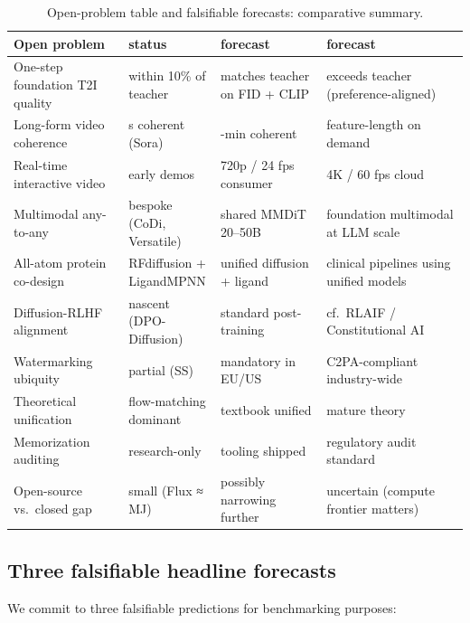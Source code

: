 \documentclass{article}
\begin{document}
\begin{table}[t]
\centering
\caption{Open-problem table and falsifiable forecasts: comparative summary.}
\label{tab:open-problem-table-and-falsifiable-forecasts}
\begin{tabular}{>{\raggedright\arraybackslash}p{0.2500\linewidth}
  >{\raggedright\arraybackslash}p{0.2016\linewidth}
  >{\raggedright\arraybackslash}p{0.2339\linewidth}
  >{\raggedright\arraybackslash}p{0.3145\linewidth}}
\toprule
Open problem & 2026 status & 2027 forecast & 2030 forecast \\
\midrule
One-step foundation T2I quality & within 10\% of teacher & matches teacher on FID + CLIP & exceeds teacher (preference-aligned) \\
Long-form video coherence & 60 s coherent (Sora) & 5-min coherent & feature-length on demand \\
Real-time interactive video & early demos & 720p / 24 fps consumer & 4K / 60 fps cloud \\
Multimodal any-to-any & bespoke (CoDi, Versatile) & shared MMDiT 20--50B & foundation multimodal at LLM scale \\
All-atom protein co-design & RFdiffusion + LigandMPNN & unified diffusion + ligand & clinical pipelines using unified models \\
Diffusion-RLHF alignment & nascent (DPO-Diffusion) & standard post-training & cf.~RLAIF / Constitutional AI \\
Watermarking ubiquity & partial (SS) & mandatory in EU/US & C2PA-compliant industry-wide \\
Theoretical unification & flow-matching dominant & textbook unified & mature theory \\
Memorization auditing & research-only & tooling shipped & regulatory audit standard \\
Open-source vs.~closed gap & small (Flux ≈ MJ) & possibly narrowing further & uncertain (compute frontier matters) \\
\end{tabular}
\end{table}

\subsection{Three falsifiable headline forecasts}\label{three-falsifiable-headline-forecasts}

We commit to three falsifiable predictions for benchmarking purposes:
\end{document}
